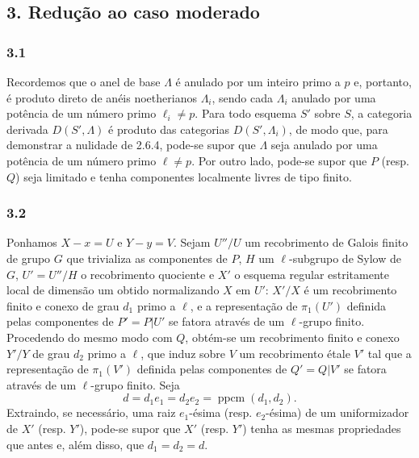 \subsection*{3. Redução ao caso moderado}

\subsubsection*{3.1}
Recordemos que o anel de base $\Lambda$ é anulado por um inteiro primo a $p$ e, portanto, é produto direto de anéis noetherianos $\Lambda_i$, sendo cada $\Lambda_i$ anulado por uma potência de um número primo $\ell_i\ne p$. Para todo esquema $S'$ sobre $S$, a categoria derivada $D(S',\Lambda)$ é produto das categorias $D(S',\Lambda_i)$, de modo que, para demonstrar a nulidade de 2.6.4, pode-se supor que $\Lambda$ seja anulado por uma potência de um número primo $\ell\ne p$. Por outro lado, pode-se supor que $P$ (resp. $Q$) seja limitado e tenha componentes localmente livres de tipo finito.

\subsubsection*{3.2}
Ponhamos $X-x=U$ e $Y-y=V$. Sejam $U''/U$ um recobrimento de Galois finito de grupo $G$ que trivializa as componentes de $P$, $H$ um $\ell$-subgrupo de Sylow de $G$, $U'=U''/H$ o recobrimento quociente e $X'$ o esquema regular estritamente local de dimensão um obtido normalizando $X$ em $U'$: $X'/X$ é um recobrimento finito e conexo de grau $d_1$ primo a $\ell$, e a representação de $\pi_1(U')$ definida pelas componentes de $P'=P|U'$ se fatora através de um $\ell$-grupo finito. Procedendo do mesmo modo com $Q$, obtém-se um recobrimento finito e conexo $Y'/Y$ de grau $d_2$ primo a $\ell$, que induz sobre $V$ um recobrimento étale $V'$ tal que a representação de $\pi_1(V')$ definida pelas componentes de $Q'=Q|V'$ se fatora através de um $\ell$-grupo finito. Seja
\[
d=d_1e_1=d_2e_2=\operatorname{ppcm}(d_1,d_2).
\]
Extraindo, se necessário, uma raiz $e_1$-ésima (resp. $e_2$-ésima) de um uniformizador de $X'$ (resp. $Y'$), pode-se supor que $X'$ (resp. $Y'$) tenha as mesmas propriedades que antes e, além disso, que $d_1=d_2=d$.

